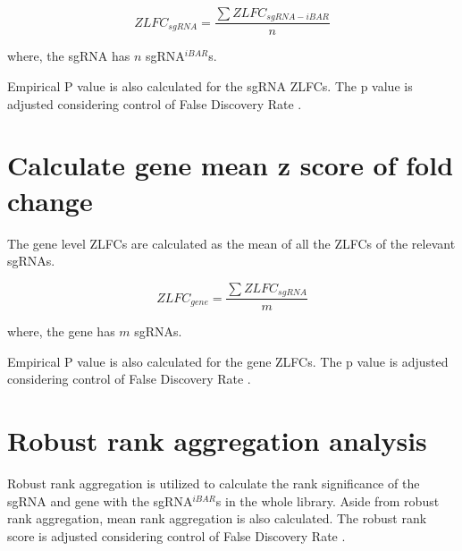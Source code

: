\documentclass[11pt, a4paper]{article}
\begin{document}
$$ZLFC_{sgRNA} = \frac{\sum{ZLFC_{sgRNA-iBAR}}}{n}$$

where, the sgRNA has $n$ sgRNA$^{iBAR}$s.

Empirical P value is also calculated for the sgRNA ZLFCs. The p value
is adjusted considering control of False Discovery Rate
\citep{benjamini_controlling_1995}.

\section{Calculate gene mean z score of fold change}

The gene level ZLFCs are calculated as the mean of all the ZLFCs of
the relevant sgRNAs.

$$ZLFC_{gene} = \frac{\sum{ZLFC_{sgRNA}}}{m}$$

where, the gene has $m$ sgRNAs.

Empirical P value is also calculated for the gene ZLFCs. The p value
is adjusted considering control of False Discovery Rate
\citep{benjamini_controlling_1995}.


\section{Robust rank aggregation analysis}


Robust rank aggregation \citep{kolde_robust_2012} is utilized to
calculate the rank significance of the sgRNA and gene with the
sgRNA$^{iBAR}$s in the whole library. Aside from robust rank
aggregation, mean rank aggregation is also calculated. The robust rank
score is adjusted considering control of False Discovery Rate
\citep{benjamini_controlling_1995}.


\end{document}
